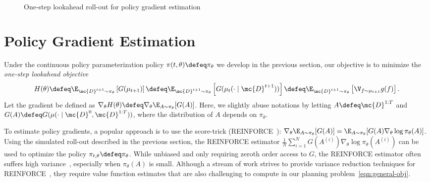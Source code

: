 \begin{figure}[t]
\begin{tikzpicture}



\end{tikzpicture}
\caption{One-step lookahead roll-out for policy gradient estimation}
\label{fig:one_step_look_ahead_general}
\end{figure}






\section{Policy Gradient Estimation}
 \label{sec:diff-piepline}

Under the continuous policy parameterization policy $\pi(t,\theta) \defeq \pi_\theta$ we develop in the previous section, our objective is to minimize the \textit{one-step lookahead objective}
\begin{align*}
H(\theta) \defeq \E_{\mc{D}^{t+1} \sim \pi_\theta} \left[G(\mu_{t+1}) \right]  \defeq  \E_{\mc{D}^{t+1} \sim \pi_\theta} \left[G(\mu_t(\cdot \mid \mc{D}^{t+1})) \right]\defeq \E_{\mc{D}^{t+1} \sim \pi_\theta} \left[ \V_{f \sim \mu_{t+1}}  g(f)  \right].
\end{align*}
Let the gradient be defined as $ \nabla_\theta H(\theta) \defeq \nabla_\theta \E_{A\sim\pi_\theta}[G(A)]$. Here, we slightly abuse notations by letting  $A\defeq\mc{D}^{1:T}$ and $G(A)\defeq G(\mu(\cdot \mid \mc{D}^{0}, \mc{D}^{1:T}))$,  where the distribution of $A$ depends on $\pi_\theta$.

To estimate policy gradients, a popular approach is to use the score-trick (\textsf{REINFORCE}~\citep{Williams92}):
 $\nabla_\theta \E_{A \sim \pi_{\theta}}[G(A)] 
= \E_{A \sim \pi_{\theta}}[G(A) 
\nabla_\theta \log \pi_{\theta}(A)]
$.  Using the simulated roll-out described in the previous section, the \textsf{REINFORCE} estimator  $\frac{1}{N} \sum_{i=1}^N G(A^{(i)}) 
\nabla_\theta \log \pi_{\theta}(A^{(i)})$ can be used to optimize the  policy $\pi_{t,\theta}\defeq \pi_\theta$. 
While unbiased and only requiring zeroth order access to $G$, the \textsf{REINFORCE} estimator often suffers high variance~\citep{RezendeMoWi14}, especially when $\pi_{\theta}(A)$ is small. 
Although a stream of work strives to provide variance reduction techniques for \textsf{REINFORCE}~\citep{MnihGr14,PapiniBiCaPiRe18},
they require value function estimates that are also challenging to compute in our planning problem~\eqref{eqn:general-obj}. 

